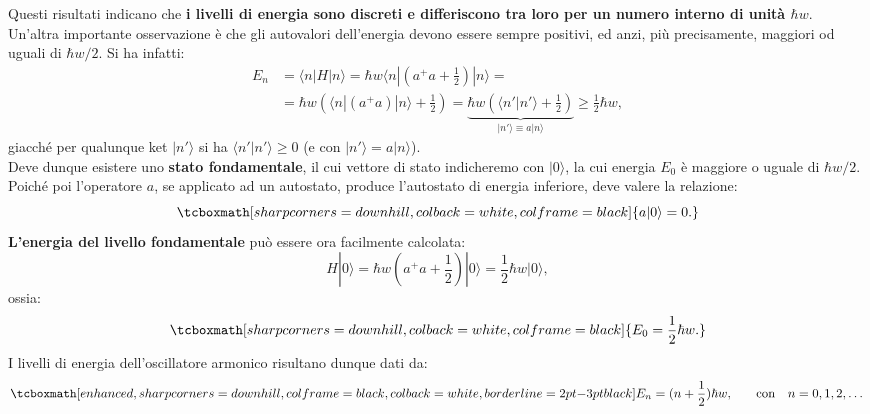 \documentclass[a4paper,12pt,oneside]{book}
\begin{document}
 Questi risultati indicano che \textbf{i livelli di energia sono discreti e differiscono tra loro per un numero interno di unità $\hbar w$}.\\
 
 Un'altra importante osservazione è che gli autovalori dell'energia devono essere sempre positivi, ed anzi, più precisamente, maggiori od uguali di $\hbar w/2$. Si ha infatti:
\begin{align}
	E_n&=\langle n|H|n \rangle= \hbar w \langle n|(a^+a+\frac{1}{2})|n\rangle= \nonumber \\
	&=\hbar w (\langle n|(a^+a)|n\rangle+\frac{1}{2})=\underbrace{\hbar w (\langle n'|n'\rangle+\frac{1}{2})}_{\vert n' \rangle \equiv a \vert n \rangle} \geq \frac{1}{2} \hbar w, 
\end{align}
giacché per qualunque ket $|n'\rangle$ si ha $\langle n'|n' \rangle\geq 0$ (e con $|n'\rangle= a|n\rangle$).\\

Deve dunque esistere uno \textbf{stato fondamentale}, il cui vettore di stato indicheremo con $|0\rangle$, la cui energia $E_0$ è maggiore o uguale di $\hbar w/2$. Poiché poi l'operatore $a$, se applicato ad un autostato, produce l'autostato di energia inferiore, deve valere la relazione:
	\begin{equation}  \label{eq:cap11_7}
		\tcboxmath[sharp corners=downhill, colback=white, colframe=black]{
			a|0\rangle=0.
			}
	\end{equation}
 \textbf{L'energia del livello fondamentale} può essere ora facilmente calcolata:
	\begin{equation}
		H|0\rangle= \hbar w(a^+a+\frac{1}{2})|0\rangle= \frac{1}{2} \hbar w |0\rangle,
	\end{equation}
ossia:
	\begin{equation}
		\tcboxmath[sharp corners=downhill, colback=white, colframe=black]{
			E_0=\frac{1}{2} \hbar w .
			}
	\end{equation}
 I livelli di energia dell'oscillatore armonico risultano dunque dati da:
	\begin{equation}
  		\label{eq:cap11_8}
		\tcboxmath[enhanced, sharp corners=downhill, colframe=black, colback=white, borderline={2pt}{-3pt}{black}]{
			E_n=(n+\frac{1}{2}) \hbar w ,
			} \qquad
			\textrm{con}\quad n=0,1,2,\dots 
\end{equation}\\
\end{document}
